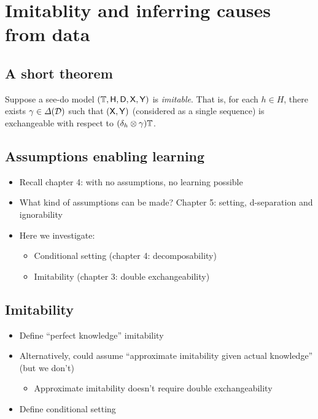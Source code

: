 

\chapter{Imitablity and inferring causes from data}\label{ch:inferring_causes}

\section{A short theorem}

Suppose a see-do model $(\mathbb{T},\mathsf{H},\mathsf{D},\mathsf{X},\mathsf{Y})$ is \emph{imitable}. That is, for each $h\in H$, there exists $\gamma\in\Delta(\mathcal{D})$ such that $(\mathsf{X},\mathsf{Y})$ (considered as a single sequence) is exchangeable with respect to $(\delta_h\otimes\gamma)\mathbb{T}$.


\section{Assumptions enabling learning}

\begin{itemize}
    \item Recall chapter 4: with no assumptions, no learning possible
    \item What kind of assumptions can be made? Chapter 5: setting, d-separation and ignorability
    \item Here we investigate:
    \begin{itemize}
        \item Conditional setting (chapter 4: decomposability)
        \item Imitability (chapter 3: double exchangeability)
    \end{itemize}
\end{itemize}

\section{Imitability}

\begin{itemize}
    \item Define ``perfect knowledge'' imitability
    \item Alternatively, could assume ``approximate imitability given actual knowledge'' (but we don't)
    \begin{itemize}
        \item Approximate imitability doesn't require double exchangeability
    \end{itemize}
    \item Define conditional setting
\end{itemize}


